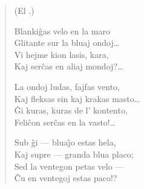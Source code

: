 \begin{verse}
\begin{center}
\footnotesize (El .)
\end{center}
                     Blanki\^gas velo en la maro\\
                     Glitante sur la bluaj ondoj\dots\\
                     Vi hejme kion lasis, kara,\\
                     Kaj ser\^cas en aliaj mondoj?\dots

                     La ondoj ludas, fajfas vento,\\
                     Kaj fleksas sin kaj krakas masto\dots\\
                     \^Gi kuras, kuras de l' kontento,\\
                     Feli\^con ser\^cas en la vasto!\dots

                     Sub \^gi --- blua\^{\j}o estas hela,\\
                     Kaj supre --- granda blua placo;\\
                     Sed la ventegon petas velo ---\\
                     \^Cu en ventegoj estas paco!?

\end{verse}

\smallrule{}